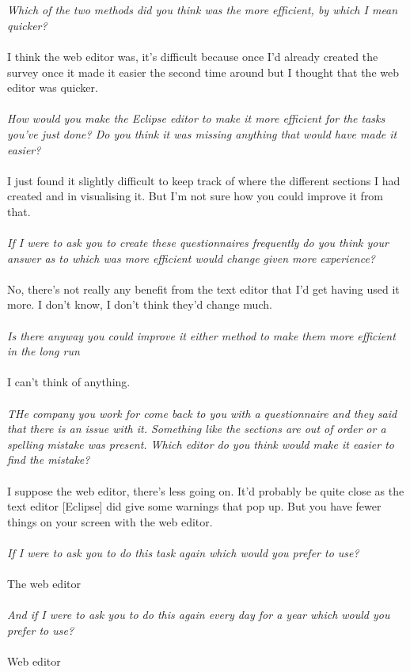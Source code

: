 \documentclass{report}
\begin{document}
\\
\\
\textit{Which of the two methods did you think was the more efficient, by which I mean quicker?}
\\
\\
I think the web editor was, it's difficult because once I'd already created the survey once it made it easier the second time around but I thought that the web editor was quicker.
\\
\\
\textit{How would you make the Eclipse editor to make it more efficient for the tasks you've just done? Do you think it was missing anything that would have made it easier?}
\\
\\
I just found it slightly difficult to keep track of where the different sections I had created and in visualising it. But I'm not sure how you could improve it from that.
\\
\\
\textit{If I were to ask you to create these questionnaires frequently do you think your answer as to which was more efficient would change given more experience?}
\\
\\
No, there's not really any benefit from the text editor that I'd get having used it more. I don't know, I don't think they'd change much.
\\
\\
\textit{Is there anyway you could improve it either method to make them more efficient in the long run}
\\
\\
I can't think of anything.
\\
\\
\textit{THe company you work for come back to you with a questionnaire and they said that there is an issue with it. Something like the sections are out of order or a spelling mistake was present. Which editor do you think would make it easier to find the mistake?}
\\
\\
I suppose the web editor, there's less going on. It'd probably be quite close as the text editor [Eclipse] did give some warnings that pop up. But you have fewer things on your screen with the web editor.
\\
\\
\textit{If I were to ask you to do this task again which would you prefer to use?}
\\
\\
The web editor
\\
\\
\textit{And if I were to ask you to do this again every day for a year which would you prefer to use?}
\\
\\
Web editor
\end{document}

